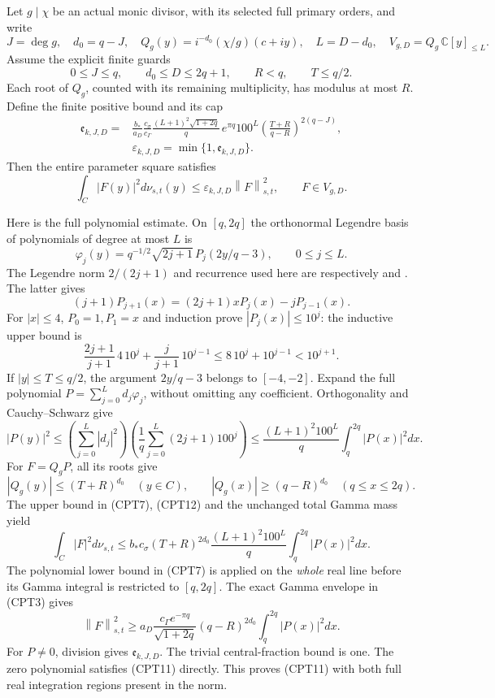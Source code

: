 \documentclass[11pt]{article}
\newcommand{\C}{\mathbb C}
\newcommand{\norm}[1]{\left\lVert#1\right\rVert}
\begin{document}
Let \(g\mid\chi\) be an actual monic divisor, with its selected full
primary orders, and write
\begin{equation}\tag{CPT9}
 J=\deg g,\quad d_0=q-J,\quad
 Q_g(y)=i^{-d_0}(\chi/g)(c+iy),\quad
 L=D-d_0,\quad
 V_{g,D}=Q_g\,\C[y]_{\le L}.
\end{equation}
Assume the explicit finite guards
\[
 0\le J\le q,\qquad d_0\le D\le2q+1,\qquad
 R<q,\qquad T\le q/2.
\]
Each root of \(Q_g\), counted with its remaining multiplicity, has
modulus at most \(R\).  Define the finite positive bound and its cap
\begin{equation}\tag{CPT10}
\begin{split}
 \mathfrak e_{k,J,D}
 ={}&\frac{b_*}{a_D}\frac{c_\sigma}{c_\Gamma}
 \frac{(L+1)^2\sqrt{1+2q}}q\,e^{\pi q}100^L
 \left(\frac{T+R}{q-R}\right)^{2(q-J)},\\
 &\varepsilon_{k,J,D}=\min\{1,\mathfrak e_{k,J,D}\}.
\end{split}
\end{equation}
Then the entire parameter square satisfies
\begin{equation}\tag{CPT11}
 \int_C |F(y)|^2d\nu_{s,t}(y)
 \le\varepsilon_{k,J,D}\norm{F}_{s,t}^2,
 \qquad F\in V_{g,D}.
\end{equation}

Here is the full polynomial estimate.  On \([q,2q]\) the
orthonormal Legendre basis of polynomials of degree at most \(L\)
is
\[
 \varphi_j(y)=q^{-1/2}\sqrt{2j+1}\,
 P_j(2y/q-3),\qquad 0\le j\le L.
\]
The Legendre norm \(2/(2j+1)\) and recurrence used here are
respectively \cite[Table 18.3.1]{dlmfLegendreNorm} and
\cite[Table 18.9.1]{dlmfLegendreRec}.  The latter gives
\[
 (j+1)P_{j+1}(x)=(2j+1)xP_j(x)-jP_{j-1}(x).
\]
For \(|x|\le4\), \(P_0=1,P_1=x\) and induction prove
\(|P_j(x)|\le10^j\): the inductive upper bound is
\[
 \frac{2j+1}{j+1}\,4\,10^j+
 \frac{j}{j+1}\,10^{j-1}
 \le8\,10^j+10^{j-1}<10^{j+1}.
\]
If \(|y|\le T\le q/2\), the argument \(2y/q-3\) belongs to
\([-4,-2]\).  Expand the full polynomial
\(P=\sum_{j=0}^L d_j\varphi_j\), without omitting any coefficient.
Orthogonality and Cauchy--Schwarz give
\begin{equation}\tag{CPT12}
 |P(y)|^2\le
 \left(\sum_{j=0}^L|d_j|^2\right)
 \left(\frac1q\sum_{j=0}^L(2j+1)100^j\right)
 \le\frac{(L+1)^2 100^L}{q}
                       \int_q^{2q}|P(x)|^2dx .
\end{equation}
For \(F=Q_gP\), all its roots give
\[
 |Q_g(y)|\le(T+R)^{d_0}\quad(y\in C),\qquad
 |Q_g(x)|\ge(q-R)^{d_0}\quad(q\le x\le2q).
\]
The upper bound in (CPT7), (CPT12) and the unchanged total Gamma
mass yield
\[
 \int_C|F|^2d\nu_{s,t}
 \le b_*c_\sigma(T+R)^{2d_0}
       \frac{(L+1)^2 100^L}{q}\int_q^{2q}|P(x)|^2dx.
\]
The polynomial lower bound in (CPT7) is applied on the \emph{whole}
real line before its Gamma integral is restricted to \([q,2q]\).
The exact Gamma envelope in (CPT3) gives
\[
 \norm{F}_{s,t}^2
 \ge a_D\frac{c_\Gamma e^{-\pi q}}{\sqrt{1+2q}}
           (q-R)^{2d_0}\int_q^{2q}|P(x)|^2dx .
\]
For \(P\ne0\), division gives \(\mathfrak e_{k,J,D}\).
The trivial central-fraction bound is one.  The zero polynomial
satisfies (CPT11) directly.  This proves (CPT11) with both full
real integration regions present in the norm.
\end{document}
